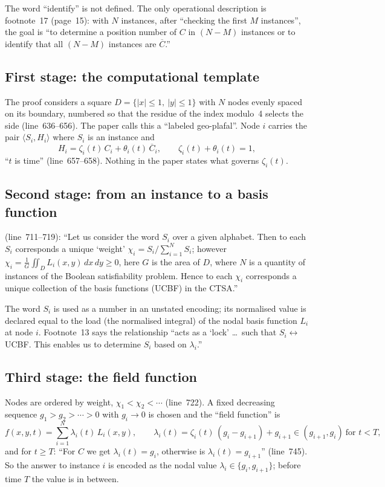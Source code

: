 \documentclass[11pt,a4paper]{article}
\newcommand{\Cbar}{\overline{C}}
\newcommand{\paperline}[1]{(line~#1)}
\begin{document}
The word ``identify'' is not defined. The only operational description is footnote~17 (page~15): with $N$ instances, after ``checking the first $M$ instances'', the goal is ``to determine a position number of $C$ in $(N-M)$ instances or to identify that all $(N-M)$ instances are $\Cbar$.''

\subsection{First stage: the computational template}

The proof considers a square $D=\{|x|\le 1,\ |y|\le 1\}$ with $N$ nodes evenly spaced on its boundary, numbered so that the residue of the index modulo~4 selects the side \paperline{636--656}. The paper calls this a ``labeled geo-plafal''. Node $i$ carries the pair $\langle S_i, H_i\rangle$ where $S_i$ is an instance and
\[
H_i=\zeta_i(t)\,C_i+\theta_i(t)\,\Cbar_i,\qquad \zeta_i(t)+\theta_i(t)=1,
\]
``$t$ is time'' \paperline{657--658}. Nothing in the paper states what governs $\zeta_i(t)$.

\subsection{Second stage: from an instance to a basis function}

\paperline{711--719}: ``Let us consider the word $S_i$ over a given alphabet. Then to each $S_i$ corresponds a unique `weight' $\chi_i = S_i/\sum_{i=1}^N S_i$; however $\chi_i=\frac1G\iint_D L_i(x,y)\,dx\,dy\ge 0$, here $G$ is the area of $D$, where $N$ is a quantity of instances of the Boolean satisfiability problem. Hence to each $\chi_i$ corresponds a unique collection of the basis functions (UCBF) in the CTSA.''

The word $S_i$ is used as a number in an unstated encoding; its normalised value is declared equal to the load (the normalised integral) of the nodal basis function $L_i$ at node $i$. Footnote~13 says the relationship ``acts as a `lock' \ldots\ such that $S_i\leftrightarrow$ UCBF. This enables us to determine $S_i$ based on $\lambda_i$.''

\subsection{Third stage: the field function}

Nodes are ordered by weight, $\chi_1<\chi_2<\cdots$ \paperline{722}. A fixed decreasing sequence $g_1>g_2>\cdots>0$ with $g_i\to 0$ is chosen and the ``field function'' is
\[
f(x,y,t)=\sum_{i=1}^N \lambda_i(t)\,L_i(x,y),\qquad
\lambda_i(t)=\zeta_i(t)\,(g_i-g_{i+1})+g_{i+1}\in(g_{i+1},g_i)\ \text{for } t<T,
\]
and for $t\ge T$: ``For $C$ we get $\lambda_i(t)=g_i$, otherwise is $\lambda_i(t)=g_{i+1}$'' \paperline{745}. So the answer to instance $i$ is encoded as the nodal value $\lambda_i\in\{g_i,g_{i+1}\}$; before time $T$ the value is in between.
\end{document}
